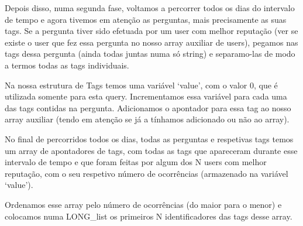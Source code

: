 \documentclass[a4paper]{report}
\begin{document}
Depois disso, numa segunda fase, voltamos a percorrer todos os dias do intervalo
de tempo e agora tivemos em atenção as perguntas, mais precisamente as suas tags.
Se a pergunta tiver sido efetuada por um user com melhor reputação (ver se existe
o user que fez essa pergunta no nosso array auxiliar de users), pegamos nas tags
dessa pergunta (ainda todas juntas numa só string) e separamo-las de modo a termos
todas as tags individuais.

Na nossa estrutura de Tags temos uma variável \textsf{‘value’}, com o valor 0,
que é utilizada somente para esta query. Incrementamos essa variável para cada
uma das tags contidas na pergunta. Adicionamos o apontador para essa tag ao nosso
array auxiliar (tendo em atenção se já a tínhamos adicionado ou não ao array).

No final de percorridos todos os dias, todas as perguntas e respetivas tags
temos um array de apontadores de tags, com todas as tags que apareceram durante
esse intervalo de tempo e que foram feitas por algum dos N users com melhor reputação,
com o seu respetivo número de ocorrências (armazenado na variável \textsf{‘value’}).

Ordenamos esse array pelo número de ocorrências (do maior para o menor) e
colocamos numa LONG\_list os primeiros N identificadores das tags desse array.
\end{document}
